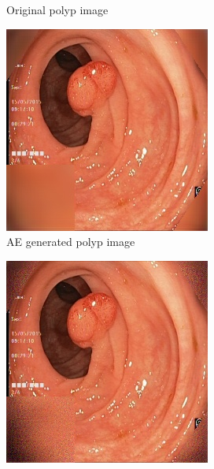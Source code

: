 \begin{figure}
\begin{subfigure}[t]{\myfigsizethree}
            \caption{Original polyp image}    
            \label{fig:p_ORIG_both1}
        \end{subfigure}
        \qquad
        \begin{subfigure}[t]{\myfigsizethree}   
            \centering 
            \includegraphics[width=\textwidth]{experiments/figures/both/PAE.jpg}
            \caption{AE generated polyp image}    
            \label{fig:p_AE_both1}
        \end{subfigure}
        \qquad%
        \begin{subfigure}[t]{\myfigsizethree}   
            \centering 
            \includegraphics[width=\textwidth]{experiments/figures/both/PGAN.jpg}

\end{subfigure}
\end{figure}
